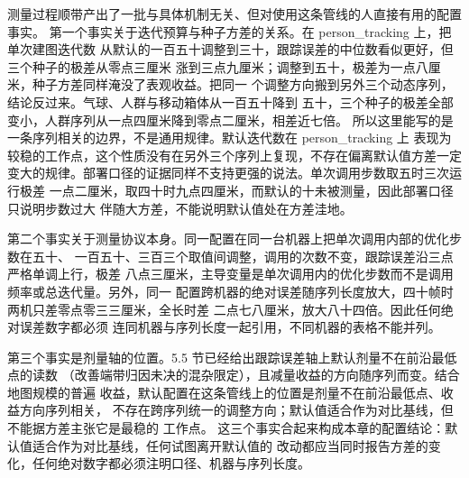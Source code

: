 测量过程顺带产出了一批与具体机制无关、但对使用这条管线的人直接有用的配置事实。
第一个事实关于迭代预算与种子方差的关系。在 person\_tracking 上，把单次建图迭代数
从默认的一百五十调整到三十，跟踪误差的中位数看似更好，但三个种子的极差从零点三厘米
涨到三点九厘米；调整到五十，极差为一点八厘米，种子方差同样淹没了表观收益。把同一
个调整方向搬到另外三个动态序列，结论反过来。气球、人群与移动箱体从一百五十降到
五十，三个种子的极差全部变小，人群序列从一点四厘米降到零点二厘米，相差近七倍。
所以这里能写的是一条序列相关的边界，不是通用规律。默认迭代数在 person\_tracking 上
表现为较稳的工作点，这个性质没有在另外三个序列上复现，不存在偏离默认值方差一定
变大的规律。部署口径的证据同样不支持更强的说法。单次调用步数取五时三次运行极差
一点二厘米，取四十时九点四厘米，而默认的十未被测量，因此部署口径只说明步数过大
伴随大方差，不能说明默认值处在方差洼地。

第二个事实关于测量协议本身。同一配置在同一台机器上把单次调用内部的优化步数在五十、
一百五十、三百三个取值间调整，调用的次数不变，跟踪误差沿三点严格单调上行，极差
八点三厘米，主导变量是单次调用内的优化步数而不是调用频率或总迭代量。另外，同一
配置跨机器的绝对误差随序列长度放大，四十帧时两机只差零点零三三厘米，全长时差
二点七八厘米，放大八十四倍。因此任何绝对误差数字都必须
连同机器与序列长度一起引用，不同机器的表格不能并列。

第三个事实是剂量轴的位置。5.5 节已经给出跟踪误差轴上默认剂量不在前沿最低点的读数
（改善端带归因未决的混杂限定），且减量收益的方向随序列而变。结合地图规模的普遍
收益，默认配置在这条管线上的位置是剂量不在前沿最低点、收益方向序列相关，
不存在跨序列统一的调整方向；默认值适合作为对比基线，但不能据方差主张它是最稳的
工作点。
这三个事实合起来构成本章的配置结论：默认值适合作为对比基线，任何试图离开默认值的
改动都应当同时报告方差的变化，任何绝对数字都必须注明口径、机器与序列长度。

